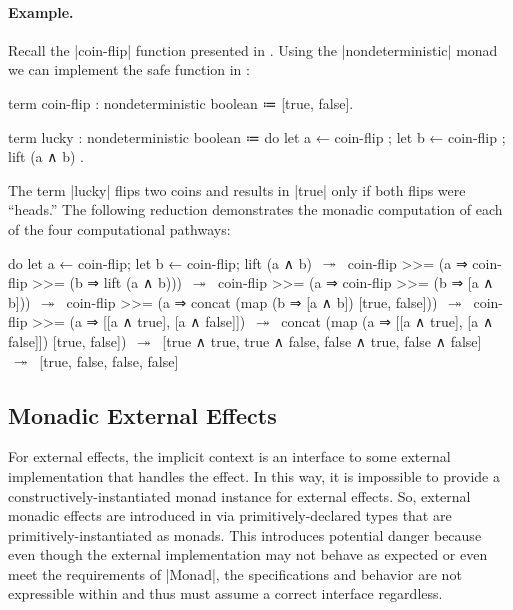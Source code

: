 \paragraph{Example.}
Recall the \code|coin-flip| function presented in \LangB.
Using the \code|nondeterministic| monad we can implement the safe function in \LangC:
%
\begin{snippet}
term coin-flip : nondeterministic boolean ≔ [true, false].

term lucky : nondeterministic boolean
  ≔ do
      { let a ← coin-flip
      ; let b ← coin-flip
      ; lift (a ∧ b) }.
\end{snippet}
%
The term \code|lucky| flips two coins and results in \code|true| only if both flips were ``heads.''
The following reduction demonstrates the monadic computation of each of the four computational pathways:
\begin{snippet}
do{ let a ← coin-flip; let b ← coin-flip; lift (a ∧ b) }
$\hspace{0.4em}\twoheadrightarrow\hspace{0.4em}$
coin-flip >>= (a ⇒ coin-flip >>= (b ⇒ lift (a ∧ b)))
$\hspace{0.4em}\twoheadrightarrow\hspace{0.4em}$
coin-flip >>= (a ⇒ coin-flip >>= (b ⇒ [a ∧ b]))
$\hspace{0.4em}\twoheadrightarrow\hspace{0.4em}$
coin-flip >>= (a ⇒ concat (map (b ⇒ [a ∧ b]) [true, false]))
$\hspace{0.4em}\twoheadrightarrow\hspace{0.4em}$
coin-flip >>= (a ⇒ [[a ∧ true], [a ∧ false]])
$\hspace{0.4em}\twoheadrightarrow\hspace{0.4em}$
concat (map (a ⇒ [[a ∧ true], [a ∧ false]]) [true, false])
$\hspace{0.4em}\twoheadrightarrow\hspace{0.4em}$
[true ∧ true, true ∧ false, false ∧ true, false ∧ false]
$\hspace{0.4em}\twoheadrightarrow\hspace{0.4em}$
[true, false, false, false]
\end{snippet}

\subsection{Monadic External Effects}

For external effects, the implicit context is an interface to some external implementation that handles the effect.
In this way, it is impossible to provide a constructively-instantiated monad instance for external effects.
So, external monadic effects are introduced in \LangC via primitively-declared types that are primitively-instantiated as monads.
This introduces potential danger because even though the external implementation may not behave as expected or even meet the requirements of \code|Monad|,
the specifications and behavior are not expressible within \LangC and thus \LangC must assume a correct interface regardless.

